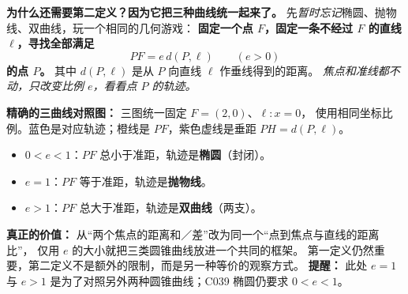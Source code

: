 \clearpage
\begin{explanationbox}
\textbf{为什么还需要第二定义？因为它把三种曲线统一起来了。}
先\emph{暂时忘记}椭圆、抛物线、双曲线，玩一个相同的几何游戏：
\textbf{固定一个点 $F$，固定一条不经过 $F$ 的直线 $\ell$，寻找全部满足}
\[
\boxed{PF=e\,d(P,\ell)\qquad(e>0)}
\]
\textbf{的点 $P$。} 其中 $d(P,\ell)$ 是从 $P$ 向直线 $\ell$ 作垂线得到的距离。
\emph{焦点和准线都不动，只改变比例 $e$，看看点 $P$ 的轨迹。}

\medskip
\textbf{精确的三曲线对照图：} 三图统一固定 $F=(2,0)$、$\ell:x=0$，
使用相同坐标比例。蓝色是对应轨迹；橙线是 $PF$，紫色虚线是垂距 $PH=d(P,\ell)$。

\begin{itemize}[leftmargin=*]
\item $0<e<1$：$PF$ 总小于准距，轨迹是\textbf{椭圆}（封闭）。
\item $e=1$：$PF$ 等于准距，轨迹是\textbf{抛物线}。
\item $e>1$：$PF$ 总大于准距，轨迹是\textbf{双曲线}（两支）。
\end{itemize}
\textbf{真正的价值：} 从“两个焦点的距离和／差”改为同一个“点到焦点与直线的距离比”，
仅用 $e$ 的大小就把三类圆锥曲线放进一个共同的框架。
第一定义仍然重要，第二定义不是额外的限制，而是另一种等价的观察方式。
\textbf{提醒：} 此处 $e=1$ 与 $e>1$ 是为了对照另外两种圆锥曲线；C039 椭圆仍要求 $0<e<1$。
\end{explanationbox}

